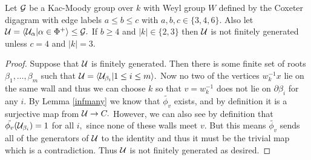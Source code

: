 \documentclass[class=book, crop=false,12 pt]{standalone}
\begin{document}
\begin{theorem}
	\label{notfinitelygenerated}
Let $\mathcal{G}$ be a Kac-Moody group over $k$ with Weyl group $W$ defined by the Coxeter digagram with edge labels $a\le b\le c$ with $a,b,c\in \{3,4,6\}.$ Also let $\mathcal{U}=\langle \mathcal{U}_\alpha|\alpha\in \Phi^+\rangle\le \mathcal{G}.$ If $b\ge 4$ and $|k|\in\{2,3\}$ then $\mathcal{U}$ is not finitely generated unless $c=4$ and $|k|=3.$
\end{theorem}
\begin{proof}
	Suppose that $\mathcal{U}$ is finitely generated. Then there is some finite set of roots $\beta_1,\dots,\beta_m$ such that $\mathcal{U}=\langle \mathcal{U}_{\beta_i}|1\le i\le m\rangle.$ Now no two of the vertices $w_k^{-1}x$ lie on the same wall and thus we can choose $k$ so that $v=w_k^{-1}$ does not lie on $\partial \beta_i$ for any $i.$ By Lemma \ref{infmany} we know that $\tilde{\phi_v}$ exists, and by definition it is a surjective map from $\mathcal{U}\to C.$ However, we can also see by definition that $\tilde{\phi_v}(\mathcal{U}_{\beta_i})=1$ for all $i,$ since none of these walls meet $v.$ But this means $\tilde{\phi_v}$ sends all of the generators of $\mathcal{U}$ to the identity and thus it must be the trivial map which is a contradiction. Thus $\mathcal{U}$ is not finitely generated as desired.
\end{proof}
\end{document}
